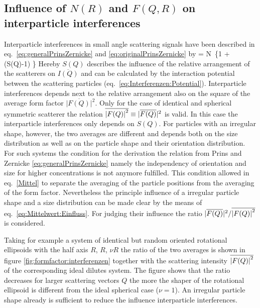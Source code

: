 \subsection{Influence of $N(R)$ and $F(Q,R)$ on interparticle interferences}
\label{chap:Einfluss:N(R):F(Q)}

Interparticle interferences in small angle scattering signals have been described in
eq.\  \ref{eq:generalPrinsZernicke}  and \ref{eq:originalPrinsZernicke} by
\BE
{} %
= N\, \left\{1 +
  \, (S(Q)-1) \right\}
\label{eq:Mittelwert:Einfluss}
\EE
Hereby $S(Q)$ describes the influence of the relative arrangement of the
scatterers on $\overline{I(Q)}$ and can be calculated by the interaction
potential between the scattering particles (eq.\ \ref{eq:Interferenzen:Potential}).
Interparticle interferences depends next to the relative arrangement also
on the square of the average form factor {\small $\vert{\overline{F(Q)}}\vert^2$}.
Only for the case of identical and spherical symmetric scatterer the relation
{\small $\overline{\abs{F(Q)}^2} \equiv \vert{\overline{F(Q)}}\vert^2$} is valid.
In this case the interparticle interferences only depends on $S(Q)$. For particles
with an irregular shape, however, the two averages are different and depends both on
the size distribution as well as on the particle shape and their orientation distribution.
For such systems the condition for the derivation the relation from Prins and Zernicke
\ref{eq:generalPrinsZernicke} namely the independency of orientation and size for higher
concentrations is not anymore fulfilled. This condition allowed in eq.\ \ref{Mittel}
to separate the averaging of the particle positions from the averaging of the form factor.
Nevertheless the principle influence of a irregular particle shape and a size distribution
can be made clear by the means of eq.\ \ref{eq:Mittelwert:Einfluss}.
For judging their influence the ratio
{\small $\vert{\overline{F(Q)}}\vert^2/\overline{\abs{F(Q)}^2}$} is considered.

Taking for example a system of identical but random oriented rotational ellipsoids
with the half axis $R$, $R$, $\nu R$ the ratio of the two averages
is shown in figure \ref{fig:formfactor:interferenzen} together with the scattering
intensity {\small $\overline{\abs{F(Q)}^2}$} of the corresponding ideal dilutes system.
The figure shows that the ratio decreases for larger scattering vectors $Q$
the more the shaper of the rotational ellipsoid is different from the ideal spherical
case ($\nu=1$). An irregular particle shape already is sufficient to reduce the influence
interparticle interferences.

